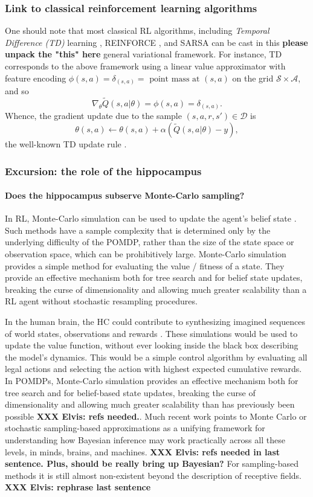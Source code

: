 \documentclass[10pt,letterpaper]{article}
\begin{document}
\subsubsection{Link to classical reinforcement learning algorithms}
One should note that most classical RL algorithms, including \textit{Temporal Difference (TD)}
learning \citep{sutton1998reinforcement}, REINFORCE \citep{williams1992}, and SARSA can be
cast in this \textbf{please unpack the "this" here}
general variational framework. For instance, TD corresponds to
the above framework using a linear value approximator with feature encoding
$\phi(s,a) = \delta_{(s,a)} =  \text{ point mass at }(s,a)$ on the grid
$\mathcal S \times \mathcal A$, and so
$$\nabla_{\theta}\tilde{Q}(s, a|\theta) = \phi(s, a) = \delta_{(s,a)}.$$
Whence, the gradient update due to the sample $(s,a,r,s') \in \mathcal D$ is
$$\theta(s,a) \leftarrow \theta(s,a) + \alpha(\tilde{Q}(s, a|\theta) - y),$$
the well-known TD update rule \citep{sutton1998reinforcement}.

\subsubsection{Excursion: the role of the hippocampus}
\paragraph{Does the hippocampus subserve Monte-Carlo sampling?}
In RL, Monte-Carlo simulation can be used to update the agent's belief state
\citep{silver2010monte}. Such methods have a sample complexity that is determined only by the underlying difficulty of the POMDP, rather than the size of the state space or observation space,
which can be prohibitively large.
Monte-Carlo simulation provides a simple method for evaluating the value / fitness of a state.
They provide an effective mechanism both for tree search and for belief state updates, breaking the curse of dimensionality and allowing much greater scalability than a RL agent without stochastic resampling procedures.

In the human brain,
the HC could contribute to synthesizing imagined sequences of world states,
observations and rewards \citep{aronov2017, chao2017interaction}.
These simulations would be used to update the value function, without ever looking inside the black box describing the model's dynamics. This would be a simple control algorithm by evaluating all legal actions and selecting the action with
highest expected cumulative rewards.
In POMDPs, Monte-Carlo simulation provides an effective mechanism both for tree search and for belief-based state updates, breaking the curse of dimensionality and allowing much greater scalability than has previously been possible
\textbf{XXX Elvis: refs needed.}.
Much recent work points to Monte Carlo or stochastic sampling-based approximations as a unifying framework for understanding how Bayesian inference may work practically across all these levels, in minds, brains, and machines. \textbf{XXX Elvis: refs needed in last sentence. Plus, should be really bring up Bayesian?} For sampling-based methods it is still almost non-existent beyond the description of receptive fields. \textbf{XXX Elvis: rephrase last sentence}
\end{document}
